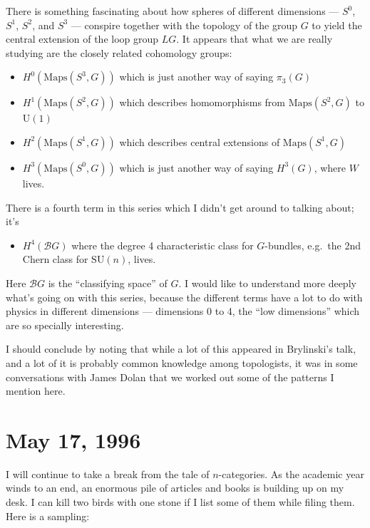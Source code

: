 \documentclass{article}
\def\tightlist{}
\begin{document}
There is something fascinating about how spheres of different dimensions
--- \(S^0\), \(S^1\), \(S^2\), and \(S^3\) --- conspire together with
the topology of the group \(G\) to yield the central extension of the
loop group \(LG\). It appears that what we are really studying are the
closely related cohomology groups:

\begin{itemize}
\tightlist
\item
  \(H^0(\mathrm{Maps}(S^3,G))\) which is just another way of saying
  \(\pi_3(G)\)
\item
  \(H^1(\mathrm{Maps}(S^2,G))\) which describes homomorphisms from
  \(\mathrm{Maps}(S^2,G)\) to \(\mathrm{U}(1)\)
\item
  \(H^2(\mathrm{Maps}(S^1,G))\) which describes central extensions of
  \(\mathrm{Maps}(S^1,G)\)
\item
  \(H^3(\mathrm{Maps}(S^0,G))\) which is just another way of saying
  \(H^3(G)\), where \(W\) lives.
\end{itemize}

There is a fourth term in this series which I didn't get around to
talking about; it's

\begin{itemize}
\tightlist
\item
  \(H^4(\mathcal{B}G)\) where the degree 4 characteristic class for
  \(G\)-bundles, e.g.~the 2nd Chern class for \(\mathrm{SU}(n)\), lives.
\end{itemize}

Here \(\mathcal{B}G\) is the ``classifying space'' of \(G\). I would
like to understand more deeply what's going on with this series, because
the different terms have a lot to do with physics in different
dimensions --- dimensions 0 to 4, the ``low dimensions'' which are so
specially interesting.

I should conclude by noting that while a lot of this appeared in
Brylinski's talk, and a lot of it is probably common knowledge among
topologists, it was in some conversations with James Dolan that we
worked out some of the patterns I mention here.



\hypertarget{week82}{%
\section{May 17, 1996}\label{week82}}

I will continue to take a break from the tale of \(n\)-categories. As
the academic year winds to an end, an enormous pile of articles and
books is building up on my desk. I can kill two birds with one stone if
I list some of them while filing them. Here is a sampling:
\end{document}
